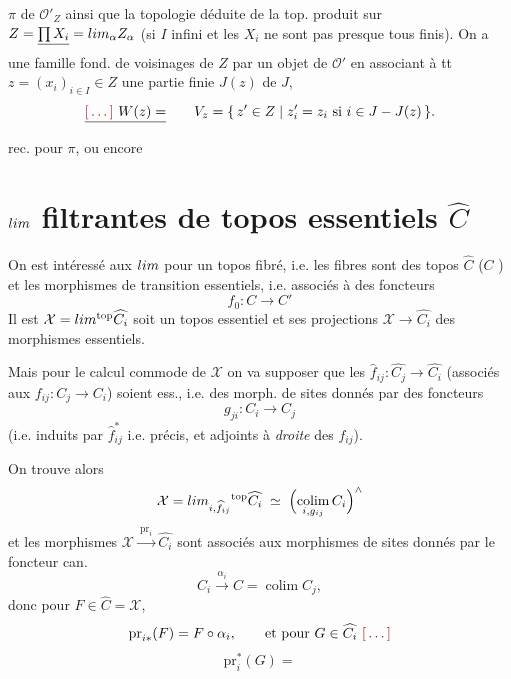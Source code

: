 \documentclass[11pt,a4paper]{article}
\begin{document}
$\pi$ de $\mathcal{O}'_{Z}$ ainsi que la topologie déduite de la top. produit
sur $Z = \struck{\prod X_{i}} = \varprojlim_{\alpha} Z_{\alpha}$ (si $I$ infini
et les $X_{i}$ ne sont pas presque tous finis). \struck{\ill{}} On a une
famille fond. de voisinages \struck{\ill{}} de $Z$ par un objet de
$\mathcal{O}'$ en associant à tt $z = (x_{i})_{i \in I} \in Z$ une partie finie
$J(z)$ de $J$,  
\[
\struck{\ill{}\ W(z) =} \qquad
V_{z} = \{\, z' \in Z \mid z'_{i} = z_{i} \text{ si } i \in J - J(z) \,\} .
\]
  rec.
pour $\pi$, ou encore

\section*{$\varprojlim$ filtrantes de topos essentiels $\widehat{C}$}

On est intéressé aux $\varprojlim$ pour un topos fibré, i.e. les fibres sont
des topos $\widehat{C}$ ($C$ \struck{\ill{}} ) et les morphismes
de transition  
essentiels, i.e. associés à des foncteurs
\[
f_{0} : C \longrightarrow C'
\]
Il est \struck{\ill{}}  $\mathcal{X} =
\varprojlim^{\mathrm{top}} \widehat{C_{i}}$ soit un topos essentiel et ses
projections $\mathcal{X} \to \widehat{C_{i}}$ des morphismes essentiels.

Mais pour le calcul commode de $\mathcal{X}$ on va supposer que les
$\widehat{f}_{ij} : \widehat{C_{j}} \to \widehat{C_{i}}$ \struck{\ill{}}
(associés aux $f_{ij} : C_{j} \to C_{i}$) soient ess., i.e. des morph. de sites
donnés par des foncteurs
\[
g_{ji} : C_{i} \longrightarrow C_{j}
\]
(i.e. induits par $\widehat{f}_{ij}^{*}$ i.e. précis, et adjoints à
\emph{droite} des $f_{ij}$).

On trouve alors
\[
\mathcal{X} = \varprojlim_{i, \widehat{f}_{ij}}{}^{\mathrm{top}} \widehat{C_{i}}
\;\simeq\; \Bigl(\operatorname*{colim}_{i, g_{ij}} C_{i}\Bigr)^{\wedge}
\]
et les morphismes $\mathcal{X} \xrightarrow{\ \mathrm{pr}_{i}\ }
\widehat{C_{i}}$ sont associés aux morphismes de sites donnés par le foncteur
can.
\[
C_{i} \xrightarrow{\ \alpha_{i}\ } C = \operatorname*{colim} C_{j} ,
\]
donc pour $F \in \widehat{C} = \mathcal{X}$, \ill{}
\[
\mathrm{pr}_{i*}(F) = F \circ \alpha_{i} ,
\qquad\text{et pour } G \in \widehat{C_{i}} \ \ill{}
\]
\[
\mathrm{pr}_{i}^{*}(G) =
\]
\end{document}
